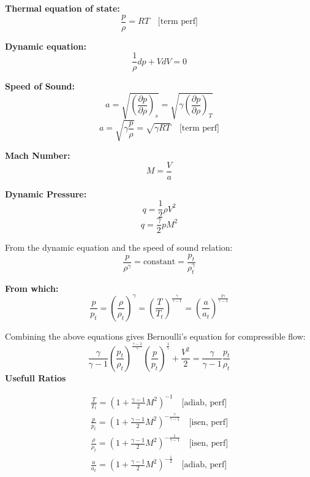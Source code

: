 \textbf{Thermal equation of state:}
\begin{equation}
\frac{p}{\rho} = RT \quad \text{[term perf]}
\end{equation}

\textbf{Dynamic equation:}
\begin{equation}
\frac{1}{\rho} dp + V dV = 0
\end{equation}

\textbf{Speed of Sound:}
\begin{equation}
a = \sqrt{\left(\frac{\partial p}{\partial \rho}\right)_s} = \sqrt{\gamma \left(\frac{\partial p}{\partial \rho}\right)_T}
\end{equation}
\begin{equation}
a = \sqrt{\gamma \frac{p}{\rho}} = \sqrt{\gamma RT} \quad \text{[term perf]}
\end{equation}

\textbf{Mach Number:}
\begin{equation}
M = \frac{V}{a}
\end{equation}

\textbf{Dynamic Pressure:}
\begin{equation}
q = \frac{1}{2} \rho V^2
\end{equation}
\begin{equation}
q = \frac{\gamma}{2} p M^2
\end{equation}

From the dynamic equation and the speed of sound relation:
\begin{equation}
\frac{p}{\rho^\gamma} = \text{constant} = \frac{p_t}{\rho_t^\gamma}
\end{equation}

\textbf{From which:}
\begin{equation}
\frac{p}{p_t} = \left(\frac{\rho}{\rho_t}\right)^\gamma = \left(\frac{T}{T_t}\right)^{\frac{\gamma}{\gamma - 1}} = \left(\frac{a}{a_t}\right)^{\frac{2\gamma}{\gamma - 1}}
\end{equation}

Combining the above equations gives Bernoulli's equation for compressible flow:
\begin{equation}
\frac{\gamma}{\gamma - 1} \left(\frac{p_t}{\rho_t}\right)^{\frac{\gamma - 1}{\gamma}} \left(\frac{p}{p_t}\right)^{\frac{1}{\gamma}} + \frac{V^2}{2} = \frac{\gamma}{\gamma - 1} \frac{p_t}{\rho_t}
\end{equation}
\textbf{Usefull Ratios}


\begin{gather}
\frac{T}{T_t} = \left(1 + \frac{\gamma - 1}{2} M^2 \right)^{-1} \quad \text{[adiab, perf]} \\
\frac{p}{p_t} = \left(1 + \frac{\gamma - 1}{2} M^2 \right)^{-\frac{\gamma}{\gamma - 1}} \quad \text{[isen, perf]} \\
\frac{\rho}{\rho_t} = \left(1 + \frac{\gamma - 1}{2} M^2 \right)^{-\frac{1}{\gamma - 1}} \quad \text{[isen, perf]} \\
\frac{a}{a_t} = \left(1 + \frac{\gamma - 1}{2} M^2 \right)^{-\frac{1}{2}} \quad \text{[adiab, perf]}
\end{gather}


